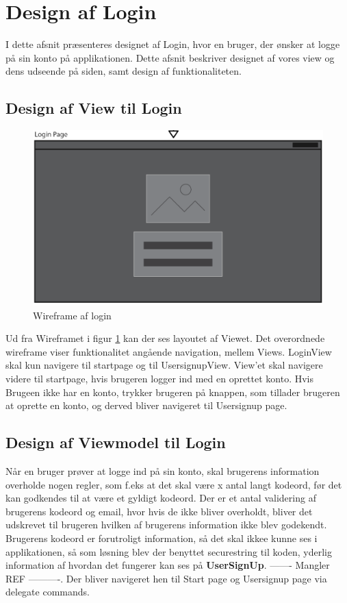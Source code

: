 \documentclass[SoftwareDesign/SoftwareDesign_main.tex]{subfiles}
\begin{document}
\section{Design af Login}
I dette afsnit præsenteres designet af Login, hvor en bruger, der ønsker at logge på sin konto på applikationen. Dette afsnit beskriver designet af vores view og dens udseende på siden, samt design af funktionaliteten.

\subsection{Design af View til Login}

\begin{figure}[H]
    \centering
    \includegraphics[width=\textwidth]{SoftwareDesign/MVVMDesigns/Graphics/LoginWireframe.png}
    \caption{Wireframe af login}
    \label{fig:LoginWireframe}
\end{figure}

Ud fra Wireframet i figur \ref{fig:LoginWireframe} kan der ses layoutet af Viewet. Det overordnede wireframe viser funktionalitet angående navigation, mellem Views. LoginView skal kun navigere til startpage og til UsersignupView. View'et skal navigere videre til startpage, hvis brugeren logger ind med en oprettet konto. Hvis Brugeen ikke har en konto, trykker brugeren på knappen, som tillader brugeren at oprette en konto, og derved bliver navigeret til Usersignup page.


\subsection{Design af Viewmodel til Login}
Når en bruger prøver at logge ind på sin konto, skal brugerens information overholde nogen regler, som f.eks at det skal være x antal langt kodeord, før det kan godkendes til at være et gyldigt kodeord. Der er et antal validering af brugerens kodeord og email, hvor hvis de ikke bliver overholdt, bliver det udskrevet til brugeren hvilken af brugerens information ikke blev godekendt. Brugerens kodeord er forutroligt information, så det skal ikkee kunne ses i applikationen, så som løsning blev der benyttet securestring til koden, yderlig information af hvordan det fungerer kan ses på \textbf{UserSignUp}. ------- Mangler REF ----------. Der bliver navigeret hen til Start page og Usersignup page via delegate commands.    
\end{document}
